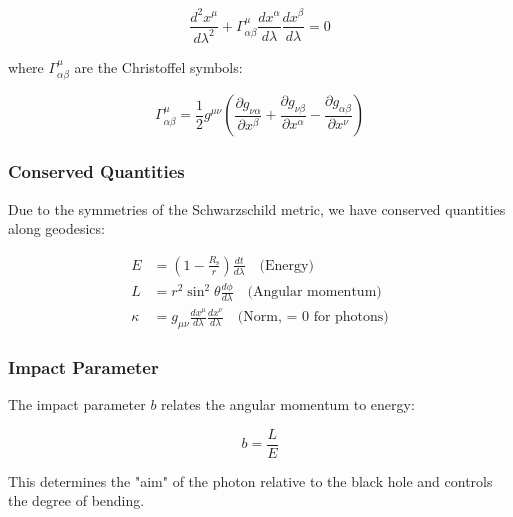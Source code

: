 \documentclass[12pt,a4paper]{article}
\theoremstyle{definition}
\theoremstyle{remark}
\newcommand{\Rs}{R_{\text{s}}}
\begin{document}
\begin{equation}
    \frac{d^2x^\mu}{d\lambda^2} + \Gamma^\mu_{\alpha\beta}\frac{dx^\alpha}{d\lambda}\frac{dx^\beta}{d\lambda} = 0
\end{equation}

where $\Gamma^\mu_{\alpha\beta}$ are the Christoffel symbols:

\begin{equation}
    \Gamma^\mu_{\alpha\beta} = \frac{1}{2}g^{\mu\nu}\left(\frac{\partial g_{\nu\alpha}}{\partial x^\beta} + \frac{\partial g_{\nu\beta}}{\partial x^\alpha} - \frac{\partial g_{\alpha\beta}}{\partial x^\nu}\right)
\end{equation}

\subsubsection{Conserved Quantities}

Due to the symmetries of the Schwarzschild metric, we have conserved quantities along geodesics:

\begin{align}
    E &= \left(1 - \frac{\Rs}{r}\right)\frac{dt}{d\lambda} \quad \text{(Energy)} \\
    L &= r^2\sin^2\theta\frac{d\phi}{d\lambda} \quad \text{(Angular momentum)} \\
    \kappa &= g_{\mu\nu}\frac{dx^\mu}{d\lambda}\frac{dx^\nu}{d\lambda} \quad \text{(Norm, = 0 for photons)}
\end{align}

\subsubsection{Impact Parameter}

The impact parameter $b$ relates the angular momentum to energy:

\begin{equation}
    b = \frac{L}{E}
\end{equation}

This determines the "aim" of the photon relative to the black hole and controls the degree of bending.
\end{document}
